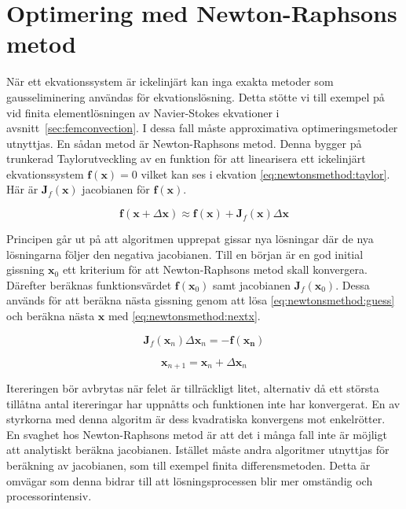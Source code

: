 \section{Optimering med Newton-Raphsons metod}

När ett ekvationssystem är ickelinjärt kan inga exakta metoder som gausseliminering användas
för ekvationslösning. Detta stötte vi till exempel på vid finita elementlösningen
av Navier-Stokes ekvationer i avsnitt~\ref{sec:femconvection}.
I dessa fall måste approximativa optimeringsmetoder utnyttjas. En sådan
metod är Newton-Raphsons metod. Denna bygger på trunkerad Taylorutveckling 
av en funktion för att linearisera ett ickelinjärt ekvationssystem
$\mathbf{f}(\mathbf{x}) = 0$
vilket kan ses i ekvation \eqref{eq:newtonsmethod:taylor}. Här är
$\mathbf{J}_f(\mathbf{x})$ jacobianen för $\mathbf{f}(\mathbf{x})$. 

\begin{equation}
\label{eq:newtonsmethod:taylor}
\mathbf{f}(\mathbf{x} + \Delta\mathbf{x}) \approx \mathbf{f}(\mathbf{x}) +
\mathbf{J}_f(\mathbf{x})\Delta\mathbf{x}
\end{equation}

\noindent
Principen går ut på att algoritmen upprepat gissar nya lösningar där de
nya lösningarna följer den negativa jacobianen. Till en början är en god initial gissning
$\mathbf{x}_0$ ett kriterium för att Newton-Raphsons metod skall konvergera. Därefter beräknas
funktionsvärdet $\mathbf{f}(\mathbf{x}_0)$ samt jacobianen $\mathbf{J}_f(\mathbf{x}_0)$.
Dessa används för att beräkna nästa gissning genom att lösa
\eqref{eq:newtonsmethod:guess} och beräkna nästa $\mathbf{x}$ med
\eqref{eq:newtonsmethod:nextx}. \cite{heath2002}

\begin{equation}
\label{eq:newtonsmethod:guess}
\mathbf{J}_f(\mathbf{x}_n)\Delta\mathbf{x}_n = -\mathbf{f}(\mathbf{x_n})
\end{equation}

\begin{equation}
\label{eq:newtonsmethod:nextx}
\mathbf{x}_{n+1} = \mathbf{x}_n + \Delta\mathbf{x}_n
\end{equation}

\noindent
Itereringen bör avbrytas när felet är tillräckligt litet, alternativ då ett största tillåtna antal itereringar har uppnåtts och funktionen inte har konvergerat. En av styrkorna 
med denna algoritm är dess kvadratiska konvergens mot enkelrötter. \cite{ympa95}
En svaghet hos Newton-Raphsons metod är att det i många fall inte är möjligt att analytiskt beräkna
jacobianen. Istället måste andra algoritmer utnyttjas för beräkning av jacobianen, som till exempel finita differensmetoden. Detta är omvägar som denna bidrar till att lösningsprocessen blir mer omständig och processorintensiv.

